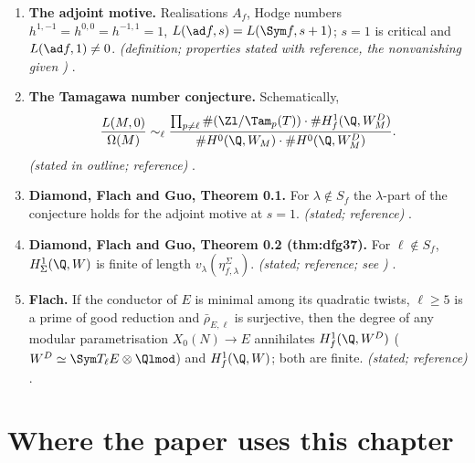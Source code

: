 \begin{enumerate}[label=\textbf{\thechapter.\arabic*}]
$\ell=5$. \emph{(computed)} .
\item \textbf{The adjoint motive.} Realisations $A_f$, Hodge numbers $h^{1,-1}=h^{0,0}=h^{-1,1}=1$, $L(\ad f,s)=L(\Sym f,s+1)$; $s=1$ is critical and $L(\ad f,1)\ne0$. \emph{(definition; properties
stated with reference, the nonvanishing given )} .
\item \textbf{The Tamagawa number conjecture.} Schematically,
\[
\frac{L(M,0)}{\Omega(M)}\sim_\ell\frac{\prod_{p\ne\ell}\#(\Zl/\Tam_p(T))\cdot\#H^1_f(\Q,W_M^D)}{\#H^0(\Q,W_M)\cdot\#H^0(\Q,W_M^D)}.
\] \emph{(stated in outline;
reference)} .
\item \textbf{Diamond, Flach and Guo, Theorem 0.1.} For $\lambda\notin S_f$ the $\lambda$-part of the conjecture holds for the adjoint motive at $s=1$. \emph{(stated; reference)} .
\item \textbf{Diamond, Flach and Guo, Theorem 0.2 (thm:dfg37).} For $\ell\notin S_f$, $H^1_\Sigma(\Q,W)$ is finite of length $v_\lambda(\eta^\Sigma_{f,\lambda})$. \emph{(stated; reference; see )}
.
\item \textbf{Flach.} If the conductor of $E$ is minimal among its quadratic twists, $\ell\ge5$ is a prime of good reduction and $\bar\rho_{E,\ell}$ is surjective, then the degree of
any modular parametrisation $X_0(N)\to E$ annihilates $H^1_f(\Q,W^D)$ ($W^D\simeq\Sym T_\ell E\otimes\Qlmod$) and $H^1_f(\Q,W)$; both are finite. \emph{(stated; reference)}
.
\end{enumerate}

\section*{Where the paper uses this chapter}

